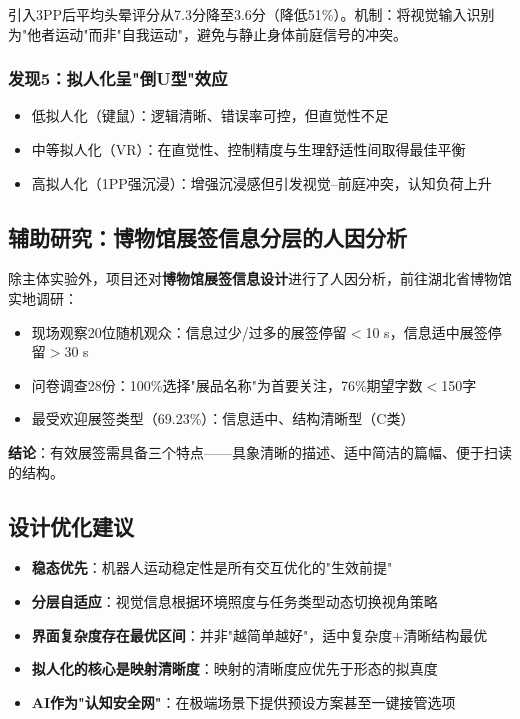 \documentclass[12pt,a4paper]{ctexart}
\begin{document}
引入3PP后平均头晕评分从7.3分降至3.6分（降低51\%）。机制：将视觉输入识别为"他者运动"而非"自我运动"，避免与静止身体前庭信号的冲突。

\subsubsection{发现5：拟人化呈"倒U型"效应}

\begin{itemize}
    \item 低拟人化（键鼠）：逻辑清晰、错误率可控，但直觉性不足
    \item 中等拟人化（VR）：在直觉性、控制精度与生理舒适性间取得最佳平衡
    \item 高拟人化（1PP强沉浸）：增强沉浸感但引发视觉--前庭冲突，认知负荷上升
\end{itemize}

\subsection{辅助研究：博物馆展签信息分层的人因分析}

除主体实验外，项目还对\textbf{博物馆展签信息设计}进行了人因分析，前往湖北省博物馆实地调研：

\begin{itemize}
    \item 现场观察20位随机观众：信息过少/过多的展签停留$<$10 s，信息适中展签停留$>$30 s
    \item 问卷调查28份：100\%选择"展品名称"为首要关注，76\%期望字数$<$150字
    \item 最受欢迎展签类型（69.23\%）：信息适中、结构清晰型（C类）
\end{itemize}

\textbf{结论}：有效展签需具备三个特点——具象清晰的描述、适中简洁的篇幅、便于扫读的结构。

\subsection{设计优化建议}

\begin{resultbox}[核心结论]
\begin{itemize}
    \item \textbf{稳态优先}：机器人运动稳定性是所有交互优化的"生效前提"
    \item \textbf{分层自适应}：视觉信息根据环境照度与任务类型动态切换视角策略
    \item \textbf{界面复杂度存在最优区间}：并非"越简单越好"，适中复杂度+清晰结构最优
    \item \textbf{拟人化的核心是映射清晰度}：映射的清晰度应优先于形态的拟真度
    \item \textbf{AI作为"认知安全网"}：在极端场景下提供预设方案甚至一键接管选项
\end{itemize}
\end{resultbox}
\end{document}
